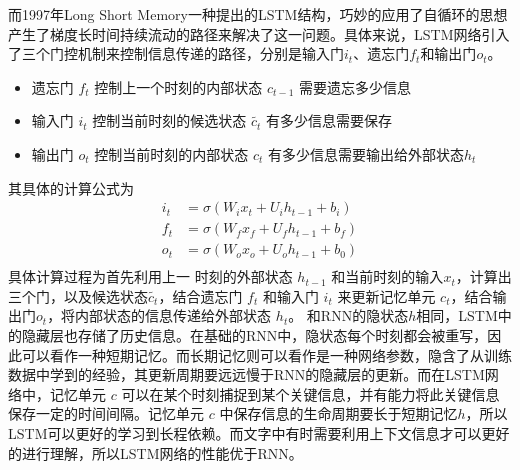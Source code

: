 \documentclass{article}
\begin{document}
而1997年Long Short Memory一种提出的LSTM结构，巧妙的应用了自循环的思想产生了梯度长时间持续流动的路径来解决了这一问题。具体来说，LSTM网络引入了三个门控机制来控制信息传递的路径，分别是输入门$i_t$、遗忘门$f_t$和输出门$o_t$。
\begin{itemize}
   \item 遗忘门 $f_t$ 控制上一个时刻的内部状态 $c_{t−1}$ 需要遗忘多少信息
   \item 输入门 $i_t$  控制当前时刻的候选状态 $\tilde{c_t}$  有多少信息需要保存
   \item  输出门 $o_t$ 控制当前时刻的内部状态 $c_t$ 有多少信息需要输出给外部状态$h_t$
\end{itemize}
其具体的计算公式为
\begin{align*}
   i_t &= \sigma(W_ix_t + U_ih_{t-1} + b_i)\\
   f_t &= \sigma(W_fx_f + U_fh_{t-1} + b_f)\\
   o_t &= \sigma(W_ox_o + U_oh_{t-1} + b_0)\\
\end{align*}
具体计算过程为首先利用上一 时刻的外部状态 $h_{t-1}$ 和当前时刻的输入$x_t$，计算出三个门，以及候选状态$\tilde{c_t}$，结合遗忘门 $f_t$ 和输入门 $i_t$ 来更新记忆单元 $c_t$，结合输出门$o_t$，将内部状态的信息传递给外部状态 $h_t$。
和RNN的隐状态$h$相同，LSTM中的隐藏层也存储了历史信息。在基础的RNN中，隐状态每个时刻都会被重写，因此可以看作一种短期记忆。而长期记忆则可以看作是一种网络参数，隐含了从训练数据中学到的经验，其更新周期要远远慢于RNN的隐藏层的更新。而在LSTM网络中，记忆单元 $c$ 可以在某个时刻捕捉到某个关键信息，并有能力将此关键信息保存一定的时间间隔。记忆单元 $c$ 中保存信息的生命周期要长于短期记忆$h$，所以LSTM可以更好的学习到长程依赖。而文字中有时需要利用上下文信息才可以更好的进行理解，所以LSTM网络的性能优于RNN。
\end{document}
